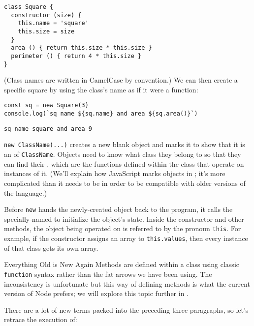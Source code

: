 \begin{verbatim}
class Square {
  constructor (size) {
    this.name = 'square'
    this.size = size
  }
  area () { return this.size * this.size }
  perimeter () { return 4 * this.size }
}
\end{verbatim}

\noindent
(Class names are written in CamelCase by convention.)
We can then create a specific square by using the class's name as if it were a function:

\begin{verbatim}
const sq = new Square(3)
console.log(`sq name ${sq.name} and area ${sq.area()}`)
\end{verbatim}

\begin{verbatim}
sq name square and area 9
\end{verbatim}

\texttt{new\ ClassName(...)} creates a new blank object
and marks it to show that it is an  of \texttt{ClassName}.
Objects need to know what class they belong to
so that they can find their ,
which are the functions defined within the class
that operate on instances of it.
(We'll explain how JavaScript marks objects in ;
it's more complicated than it needs to be
in order to be compatible with older versions of the language.)


Before \texttt{new} hands the newly-created object back to the program,
it calls the specially-named 
to initialize the object's state.
Inside the constructor and other methods,
the object being operated on is referred to by the pronoun \texttt{this}.
For example,
if the constructor assigns an array to \texttt{this.values},
then every instance of that class gets its own array.

\begin{aside}{Everything Old is New Again}
  Methods are defined within a class using classic \texttt{function} syntax
  rather than the fat arrows we have been using.
  The inconsistency is unfortunate
  but this way of defining methods is what the current version of Node prefers;
  we will explore this topic further in .
\end{aside}

There are a lot of new terms packed into the preceding three paragraphs,
so let's retrace the execution of:

